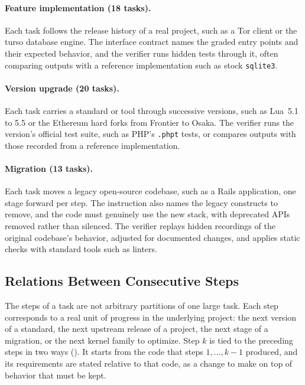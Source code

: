 \documentclass{article}
\begin{document}
\paragraph{Feature implementation (18 tasks).}
Each task follows the release history of a real project, such as a Tor client
or the turso database engine. The interface contract names the graded entry
points and their expected behavior, and the verifier runs hidden tests through
it, often comparing outputs with a reference implementation such as stock
\texttt{sqlite3}.

\paragraph{Version upgrade (20 tasks).}
Each task carries a standard or tool through successive versions, such as
Lua~5.1 to 5.5 or the Ethereum hard forks from Frontier to Osaka. The verifier
runs the version's official test suite, such as PHP's \texttt{.phpt} tests, or
compares outputs with those recorded from a reference implementation.

\paragraph{Migration (13 tasks).}
Each task moves a legacy open-source codebase, such as a Rails application, one
stage forward per step. The instruction also names the legacy constructs to
remove, and the code must genuinely use the new stack, with deprecated APIs
removed rather than silenced. The verifier replays hidden recordings of the
original codebase's behavior, adjusted for documented changes, and applies
static checks with standard tools such as linters.

\subsection{Relations Between Consecutive Steps}
\label{sec:relations}

The steps of a task are not arbitrary partitions of one large task. Each step
corresponds to a real unit of progress in the underlying project: the next
version of a standard, the next upstream release of a project, the next stage
of a migration, or the next kernel family to optimize. Step $k$ is tied to the
preceding steps in two ways (). It starts from the code
that steps $1,\dots,k-1$ produced, and its requirements are stated relative to
that code, as a change to make on top of behavior that must be kept.
\end{document}
